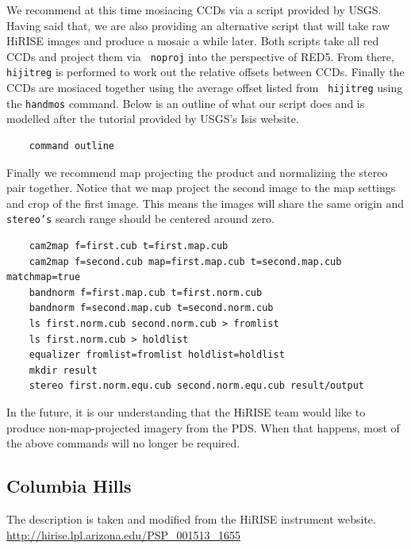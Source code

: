We recommend at this time mosiacing CCDs via a script provided by
USGS. Having said that, we are also providing an alternative script
that will take raw HiRISE images and produce a mosaic a while
later. Both scripts take all red CCDs and project them via {\tt
  noproj} into the perspective of RED5. From there, {\tt hijitreg} is
performed to work out the relative offsets between CCDs. Finally the
CCDs are mosiaced together using the average offset listed from {\tt
  hijitreg} using the {\tt handmos} command. Below is an outline of
what our script does and is modelled after the tutorial provided by
USGS's Isis website.

\begin{verbatim}
    command outline
\end{verbatim}

Finally we recommend map projecting the product and normalizing the
stereo pair together. Notice that we map project the second image to
the map settings and crop of the first image. This means the images
will share the same origin and {\tt stereo's} search range should be
centered around zero.

\begin{verbatim}
    cam2map f=first.cub t=first.map.cub
    cam2map f=second.cub map=first.map.cub t=second.map.cub matchmap=true
    bandnorm f=first.map.cub t=first.norm.cub
    bandnorm f=second.map.cub t=second.norm.cub
    ls first.norm.cub second.norm.cub > fromlist
    ls first.norm.cub > holdlist
    equalizer fromlist=fromlist holdlist=holdlist
    mkdir result
    stereo first.norm.equ.cub second.norm.equ.cub result/output
\end{verbatim}

In the future, it is our understanding that the HiRISE team would like
to produce non-map-projected imagery from the PDS. When that happens,
most of the above commands will no longer be required.

\subsection{Columbia Hills}

The description is taken and modified from the HiRISE instrument website.
\url{http://hirise.lpl.arizona.edu/PSP_001513_1655}

